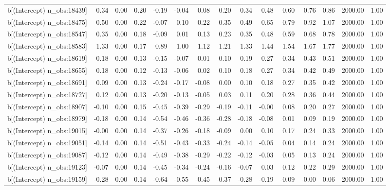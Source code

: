 \begin{table}[ht]
\begin{tabular}{rrrrrrrrrrrrrrr}
  b[(Intercept) n\_obs:18439] & 0.34 & 0.00 & 0.20 & -0.19 & -0.04 & 0.08 & 0.20 & 0.34 & 0.48 & 0.60 & 0.76 & 0.86 & 2000.00 & 1.00 \\ 
  b[(Intercept) n\_obs:18475] & 0.50 & 0.00 & 0.22 & -0.07 & 0.10 & 0.22 & 0.35 & 0.49 & 0.65 & 0.79 & 0.92 & 1.07 & 2000.00 & 1.00 \\ 
  b[(Intercept) n\_obs:18547] & 0.35 & 0.00 & 0.18 & -0.09 & 0.01 & 0.13 & 0.23 & 0.35 & 0.48 & 0.59 & 0.68 & 0.78 & 2000.00 & 1.00 \\ 
  b[(Intercept) n\_obs:18583] & 1.33 & 0.00 & 0.17 & 0.89 & 1.00 & 1.12 & 1.21 & 1.33 & 1.44 & 1.54 & 1.67 & 1.77 & 2000.00 & 1.00 \\ 
  b[(Intercept) n\_obs:18619] & 0.18 & 0.00 & 0.13 & -0.15 & -0.07 & 0.01 & 0.10 & 0.19 & 0.27 & 0.34 & 0.43 & 0.51 & 2000.00 & 1.00 \\ 
  b[(Intercept) n\_obs:18655] & 0.18 & 0.00 & 0.12 & -0.13 & -0.06 & 0.02 & 0.10 & 0.18 & 0.27 & 0.34 & 0.42 & 0.49 & 2000.00 & 1.00 \\ 
  b[(Intercept) n\_obs:18691] & 0.09 & 0.00 & 0.13 & -0.24 & -0.17 & -0.08 & 0.00 & 0.10 & 0.18 & 0.27 & 0.35 & 0.42 & 2000.00 & 1.00 \\ 
  b[(Intercept) n\_obs:18727] & 0.12 & 0.00 & 0.13 & -0.20 & -0.13 & -0.05 & 0.03 & 0.11 & 0.20 & 0.28 & 0.36 & 0.44 & 2000.00 & 1.00 \\ 
  b[(Intercept) n\_obs:18907] & -0.10 & 0.00 & 0.15 & -0.45 & -0.39 & -0.29 & -0.19 & -0.11 & -0.00 & 0.08 & 0.20 & 0.27 & 2000.00 & 1.00 \\ 
  b[(Intercept) n\_obs:18979] & -0.18 & 0.00 & 0.14 & -0.54 & -0.46 & -0.36 & -0.28 & -0.18 & -0.08 & 0.01 & 0.09 & 0.19 & 2000.00 & 1.00 \\ 
  b[(Intercept) n\_obs:19015] & -0.00 & 0.00 & 0.14 & -0.37 & -0.26 & -0.18 & -0.09 & 0.00 & 0.10 & 0.17 & 0.24 & 0.33 & 2000.00 & 1.00 \\ 
  b[(Intercept) n\_obs:19051] & -0.14 & 0.00 & 0.14 & -0.51 & -0.43 & -0.33 & -0.24 & -0.14 & -0.05 & 0.04 & 0.14 & 0.24 & 2000.00 & 1.00 \\ 
  b[(Intercept) n\_obs:19087] & -0.12 & 0.00 & 0.14 & -0.49 & -0.38 & -0.29 & -0.22 & -0.12 & -0.03 & 0.05 & 0.13 & 0.24 & 2000.00 & 1.00 \\ 
  b[(Intercept) n\_obs:19123] & -0.07 & 0.00 & 0.14 & -0.45 & -0.34 & -0.24 & -0.16 & -0.07 & 0.03 & 0.12 & 0.22 & 0.29 & 2000.00 & 1.00 \\ 
  b[(Intercept) n\_obs:19159] & -0.28 & 0.00 & 0.14 & -0.64 & -0.55 & -0.45 & -0.37 & -0.28 & -0.19 & -0.09 & -0.00 & 0.06 & 2000.00 & 1.00 \\ 

\end{tabular}
\end{table}

